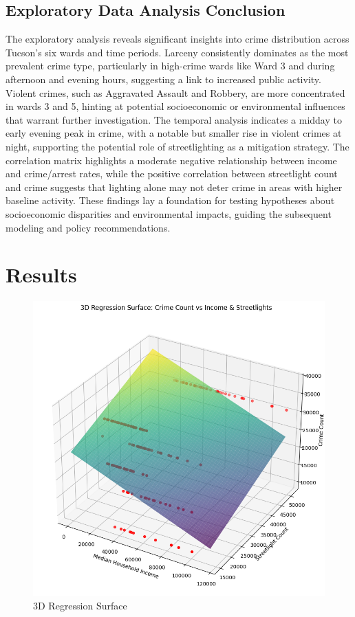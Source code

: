 \documentclass{report}
\begin{document}
\section{Exploratory Data Analysis Conclusion}
\par The exploratory analysis reveals significant insights into crime distribution across Tucson’s six wards and time periods. Larceny consistently dominates as the most prevalent crime type, particularly in high-crime wards like Ward 3 and during afternoon and evening hours, suggesting a link to increased public activity. Violent crimes, such as Aggravated Assault and Robbery, are more concentrated in wards 3 and 5, hinting at potential socioeconomic or environmental influences that warrant further investigation. The temporal analysis indicates a midday to early evening peak in crime, with a notable but smaller rise in violent crimes at night, supporting the potential role of streetlighting as a mitigation strategy. The correlation matrix highlights a moderate negative relationship between income and crime/arrest rates, while the positive correlation between streetlight count and crime suggests that lighting alone may not deter crime in areas with higher baseline activity. These findings lay a foundation for testing hypotheses about socioeconomic disparities and environmental impacts, guiding the subsequent modeling and policy recommendations.

\chapter{Results}


\begin{figure}[ht]
  \begin{center}
    \advance\leftskip-3cm
    \advance\rightskip-3cm
    \includegraphics[keepaspectratio=true,scale=.5]{3d-cover}
    \caption{3D Regression Surface}
    \label{fig:3d-cover}
  \end{center}
\end{figure}
\end{document}
